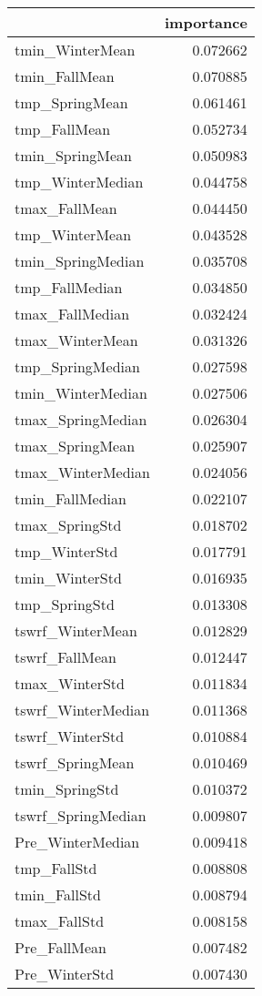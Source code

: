 \begin{tabular}{lr}
\toprule
 & importance \\
\midrule
tmin_WinterMean & 0.072662 \\
tmin_FallMean & 0.070885 \\
tmp_SpringMean & 0.061461 \\
tmp_FallMean & 0.052734 \\
tmin_SpringMean & 0.050983 \\
tmp_WinterMedian & 0.044758 \\
tmax_FallMean & 0.044450 \\
tmp_WinterMean & 0.043528 \\
tmin_SpringMedian & 0.035708 \\
tmp_FallMedian & 0.034850 \\
tmax_FallMedian & 0.032424 \\
tmax_WinterMean & 0.031326 \\
tmp_SpringMedian & 0.027598 \\
tmin_WinterMedian & 0.027506 \\
tmax_SpringMedian & 0.026304 \\
tmax_SpringMean & 0.025907 \\
tmax_WinterMedian & 0.024056 \\
tmin_FallMedian & 0.022107 \\
tmax_SpringStd & 0.018702 \\
tmp_WinterStd & 0.017791 \\
tmin_WinterStd & 0.016935 \\
tmp_SpringStd & 0.013308 \\
tswrf_WinterMean & 0.012829 \\
tswrf_FallMean & 0.012447 \\
tmax_WinterStd & 0.011834 \\
tswrf_WinterMedian & 0.011368 \\
tswrf_WinterStd & 0.010884 \\
tswrf_SpringMean & 0.010469 \\
tmin_SpringStd & 0.010372 \\
tswrf_SpringMedian & 0.009807 \\
Pre_WinterMedian & 0.009418 \\
tmp_FallStd & 0.008808 \\
tmin_FallStd & 0.008794 \\
tmax_FallStd & 0.008158 \\
Pre_FallMean & 0.007482 \\
Pre_WinterStd & 0.007430 \\

\end{tabular}

